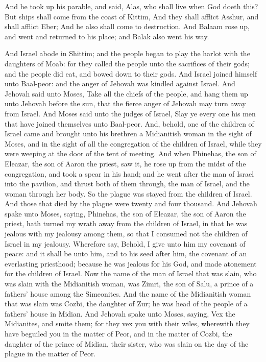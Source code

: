 And he took up his parable, and said, Alas, who shall live when God doeth this?  But ships shall come from the coast of Kittim, And they shall afflict Asshur, and shall afflict Eber; And he also shall come to destruction.  And Balaam rose up, and went and returned to his place; and Balak also went his way. 

And Israel abode in Shittim; and the people began to play the harlot with the daughters of Moab: for they called the people unto the sacrifices of their gods; and the people did eat, and bowed down to their gods. And Israel joined himself unto Baal-peor: and the anger of Jehovah was kindled against Israel. And Jehovah said unto Moses, Take all the chiefs of the people, and hang them up unto Jehovah before the sun, that the fierce anger of Jehovah may turn away from Israel. And Moses said unto the judges of Israel, Slay ye every one his men that have joined themselves unto Baal-peor.  And, behold, one of the children of Israel came and brought unto his brethren a Midianitish woman in the sight of Moses, and in the sight of all the congregation of the children of Israel, while they were weeping at the door of the tent of meeting. And when Phinehas, the son of Eleazar, the son of Aaron the priest, saw it, he rose up from the midst of the congregation, and took a spear in his hand; and he went after the man of Israel into the pavilion, and thrust both of them through, the man of Israel, and the woman through her body. So the plague was stayed from the children of Israel. And those that died by the plague were twenty and four thousand.  And Jehovah spake unto Moses, saying, Phinehas, the son of Eleazar, the son of Aaron the priest, hath turned my wrath away from the children of Israel, in that he was jealous with my jealousy among them, so that I consumed not the children of Israel in my jealousy. Wherefore say, Behold, I give unto him my covenant of peace: and it shall be unto him, and to his seed after him, the covenant of an everlasting priesthood; because he was jealous for his God, and made atonement for the children of Israel.  Now the name of the man of Israel that was slain, who was slain with the Midianitish woman, was Zimri, the son of Salu, a prince of a fathers’ house among the Simeonites. And the name of the Midianitish woman that was slain was Cozbi, the daughter of Zur; he was head of the people of a fathers’ house in Midian.  And Jehovah spake unto Moses, saying, Vex the Midianites, and smite them; for they vex you with their wiles, wherewith they have beguiled you in the matter of Peor, and in the matter of Cozbi, the daughter of the prince of Midian, their sister, who was slain on the day of the plague in the matter of Peor. 

